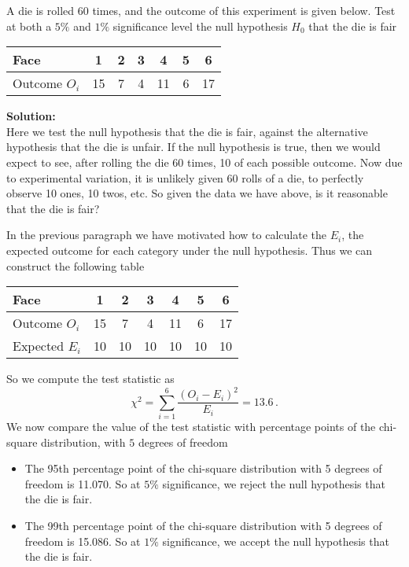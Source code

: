 \documentclass[12pt]{article}
\newenvironment{example}[1][Example:]{\begin{trivlist}
\item[\hskip \labelsep {\bfseries #1}]}{\end{trivlist}}
\begin{document}
\begin{example}
A die is rolled 60 times, and the outcome of this experiment is given below. Test at both a $5\%$ and $1\%$ significance level the null hypothesis $H_{0}$ that the die is fair
\begin{center}
\begin{tabular}{|l|c|c|c|c|c|c|}
  \hline
  Face & 1 & 2 & 3 & 4 & 5 & 6 \\ \hline
  Outcome $O_{i}$ & 15 & 7 & 4 & 11 & 6 & 17 \\
  \hline
\end{tabular}
\end{center}
\end{example}
\begin{mdframed}
{\bf Solution:}\\
Here we test the null hypothesis that the die is fair, against the alternative hypothesis that the die is unfair. If the null hypothesis is true, then we would expect to see, after rolling the die 60 times, 10 of each possible outcome. Now due to experimental variation, it is unlikely given $60$ rolls of a die, to perfectly observe 10 ones, 10 twos, etc. So given the data we have above, is it reasonable that the die is fair?

In the previous paragraph we have motivated how to calculate the $E_{i}$, the expected outcome for each category under the null hypothesis. Thus we can construct the following table
\begin{center}
\begin{tabular}{|l|c|c|c|c|c|c|}
  \hline
  Face & 1 & 2 & 3 & 4 & 5 & 6 \\ \hline
  Outcome $O_{i}$ & 15 & 7 & 4 & 11 & 6 & 17 \\
  Expected $E_{i}$ & 10 & 10 & 10 &10 &10 &10\\
  \hline
\end{tabular}
\end{center}

So we compute the test statistic as
$$
\chi^{2}=\sum_{i=1}^{6}\frac{(O_{i}-E_{i})^2}{E_{i}}=13.6 \, .
$$
We now compare the value of the test statistic with percentage points of the chi-square distribution, with $5$ degrees of freedom
\begin{itemize}
\item The 95th percentage point of the chi-square distribution with 5 degrees of freedom is 11.070. So at $5\%$ significance, we reject the null hypothesis that the die is fair.
\item The 99th percentage point of the chi-square distribution with 5 degrees of freedom is 15.086. So at $1\%$ significance, we accept the null hypothesis that the die is fair.
\end{itemize}
\end{mdframed}
\end{document}
